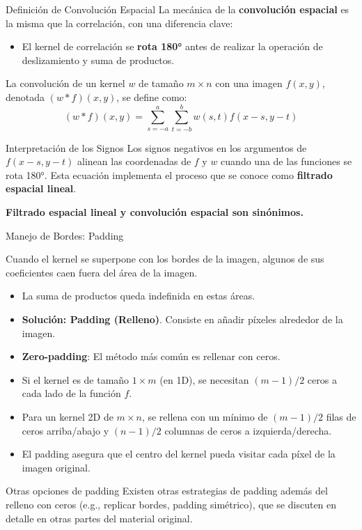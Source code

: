 \documentclass[10pt]{beamer}
\newcommand{\eqnum}[1]{\tag{#1}} %
\begin{document}
\begin{frame}[fragile]{Definición de Convolución Espacial}
La mecánica de la \textbf{convolución espacial} es la misma que la correlación, con una diferencia clave:
{\footnotesize
\begin{itemize}
\item El kernel de correlación se \textbf{rota 180°} antes de realizar la operación de deslizamiento y suma de productos.
\end{itemize}
}
\vspace{0.1cm}
La convolución de un kernel $w$ de tamaño $m \times n$ con una imagen $f(x,y)$, denotada $(w * f)(x,y)$, se define como:
\begin{equation}
(w * f)(x,y) = \sum_{s=-a}^{a} \sum_{t=-b}^{b} w(s,t)f(x-s,y-t) \eqnum{3-35}
\end{equation}
\begin{alertblock}{\footnotesize Interpretación de los Signos}
{\footnotesize Los signos negativos en los argumentos de $f(x-s, y-t)$ alinean las coordenadas de $f$ y $w$ cuando una de las funciones se rota 180°. Esta ecuación implementa el proceso que se conoce como \textbf{filtrado espacial lineal}.}
\end{alertblock}
\textbf{\footnotesize Filtrado espacial lineal y convolución espacial son sinónimos.}
\end{frame}

\begin{frame}{Manejo de Bordes: Padding}
{\footnotesize
Cuando el kernel se superpone con los bordes de la imagen, algunos de sus coeficientes caen fuera del área de la imagen.
\begin{itemize}
\item La suma de productos queda indefinida en estas áreas.
\item \textbf{Solución: Padding (Relleno)}. Consiste en añadir píxeles alrededor de la imagen.
\item \textbf{Zero-padding}: El método más común es rellenar con ceros.
\item Si el kernel es de tamaño $1 \times m$ (en 1D), se necesitan $(m-1)/2$ ceros a cada lado de la función $f$.
\item Para un kernel 2D de $m \times n$, se rellena con un mínimo de $(m-1)/2$ filas de ceros arriba/abajo y $(n-1)/2$ columnas de ceros a izquierda/derecha.
\item El padding asegura que el centro del kernel pueda visitar cada píxel de la imagen original.
\end{itemize}
\begin{exampleblock}{Otras opciones de padding}
Existen otras estrategias de padding además del relleno con ceros (e.g., replicar bordes, padding simétrico), que se discuten en detalle en otras partes del material original.
\end{exampleblock}
}
\end{frame}
\end{document}
